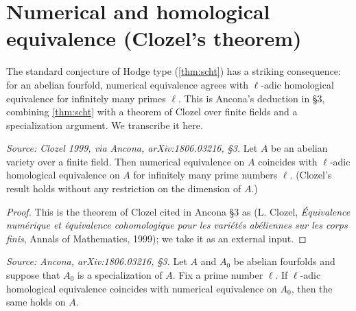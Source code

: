 \chapter{Numerical and homological equivalence (Clozel's theorem)}

The standard conjecture of Hodge type (\cref{thm:scht}) has a striking
consequence: for an abelian fourfold, numerical equivalence agrees with
\(\ell\)-adic homological equivalence for infinitely many primes \(\ell\). This
is Ancona's deduction in \S3, combining \cref{thm:scht} with a theorem of Clozel
over finite fields and a specialization argument. We transcribe it here.

\begin{theorem}[Clozel, numerical \(=\) homological over finite fields]
  \label{thm:clozel-finite-field}
  \textit{Source: Clozel 1999, via Ancona, arXiv:1806.03216, §3.}
  Let \(A\) be an abelian variety over a finite field. Then numerical equivalence
  on \(A\) coincides with \(\ell\)-adic homological equivalence on \(A\) for
  infinitely many prime numbers \(\ell\). (Clozel's result holds without any
  restriction on the dimension of \(A\).)
\end{theorem}

\begin{proof}
  This is the theorem of Clozel cited in Ancona \S3 as \cite{Clozel} (L. Clozel,
  \emph{Équivalence numérique et équivalence cohomologique pour les variétés
  abéliennes sur les corps finis}, Annals of Mathematics, 1999); we take it as an
  external input.
\end{proof}

\begin{corollary}
  \label{cor:thmhomnum}
  \textit{Source: Ancona, arXiv:1806.03216, §3.}
  Let \(A\) and \(A_0\) be abelian fourfolds and suppose that \(A_0\) is a
  specialization of \(A\). Fix a prime number \(\ell\). If \(\ell\)-adic
  homological equivalence coincides with numerical equivalence on \(A_0\), then
  the same holds on \(A\).
\end{corollary}

